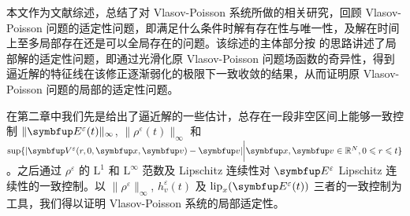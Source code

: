 \begin{cabstract}
  本文作为文献综述，总结了对 Vlasov-Poisson 系统所做的相关研究，回顾 Vlasov-Poisson 问题的适定性问题，即满足什么条件时解有存在性与唯一性，及解在时间上至多局部存在还是可以全局存在的问题。该综述的主体部分按 \cite{HorstClasssicalI} 的思路讲述了局部解的适定性问题，即通过光滑化原 Vlasov-Poisson 问题场函数的奇异性，得到逼近解的特征线在该修正逐渐弱化的极限下一致收敛的结果，从而证明原 Vlasov-Poisson 问题的局部的适定性问题。

  在第二章中我们先是给出了逼近解的一些估计，总存在一段非空区间上能够一致控制 $\|\vE^\varepsilon(t)\|_\infty$, $\|\rho^\varepsilon(t)\|_\infty$ 和 $\sup \{|\vect{V}^\varepsilon(r,0,\vx,\vv)-\vv| \bigg|\vx,\vv \in \bbR^N, 0\leqslant r \leqslant t \}$。之后通过 $\rho^\varepsilon$ 的 $\mathrm{L}^1$ 和 $\mathrm{L}^\infty$ 范数及 Lipschitz 连续性对 $\vE^\varepsilon$ Lipschitz 连续性的一致控制。以 $\|\rho^\varepsilon\|_\infty$, $h_v^\varepsilon(t)$ 及 $\operatorname{lip}_x (\vE^\varepsilon(t))$ 三者的一致控制为工具，我们得以证明 Vlasov-Poisson 系统的局部适定性。
  
  
  
\end{cabstract}


